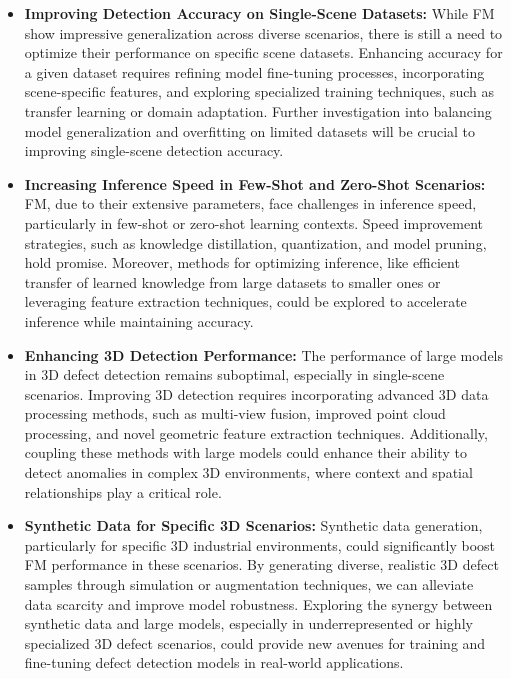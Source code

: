 \documentclass[journal,comsoc]{IEEEtran}
\begin{document}
\begin{itemize}
\item \textbf{Improving Detection Accuracy on Single-Scene Datasets:} While FM show impressive generalization across diverse scenarios, there is still a need to optimize their performance on specific scene datasets. Enhancing accuracy for a given dataset requires refining model fine-tuning processes, incorporating scene-specific features, and exploring specialized training techniques, such as transfer learning or domain adaptation. Further investigation into balancing model generalization and overfitting on limited datasets will be crucial to improving single-scene detection accuracy.

\item \textbf{Increasing Inference Speed in Few-Shot and Zero-Shot Scenarios:} FM, due to their extensive parameters, face challenges in inference speed, particularly in few-shot or zero-shot learning contexts. Speed improvement strategies, such as knowledge distillation, quantization, and model pruning, hold promise. Moreover, methods for optimizing inference, like efficient transfer of learned knowledge from large datasets to smaller ones or leveraging feature extraction techniques, could be explored to accelerate inference while maintaining accuracy.

\item \textbf{Enhancing 3D Detection Performance:} The performance of large models in 3D defect detection remains suboptimal, especially in single-scene scenarios. Improving 3D detection requires incorporating advanced 3D data processing methods, such as multi-view fusion, improved point cloud processing, and novel geometric feature extraction techniques. Additionally, coupling these methods with large models could enhance their ability to detect anomalies in complex 3D environments, where context and spatial relationships play a critical role.

\item \textbf{Synthetic Data for Specific 3D Scenarios:} Synthetic data generation, particularly for specific 3D industrial environments, could significantly boost FM performance in these scenarios. By generating diverse, realistic 3D defect samples through simulation or augmentation techniques, we can alleviate data scarcity and improve model robustness. Exploring the synergy between synthetic data and large models, especially in underrepresented or highly specialized 3D defect scenarios, could provide new avenues for training and fine-tuning defect detection models in real-world applications.
\end{itemize}
\end{document}
